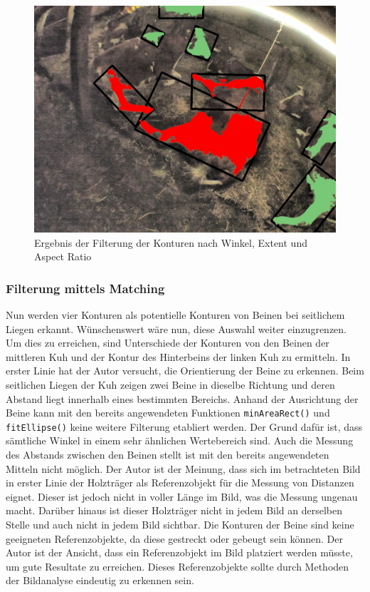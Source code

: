 \begin{figure}[H]
	\center
	\includegraphics[scale=0.43]{Grafiken/entwicklung/30FilteredByExtentAspectAngle.jpg}
	\caption{Ergebnis der Filterung der Konturen nach Winkel, Extent und Aspect Ratio} 
	\label{fig: Ergebnis der Filterung der Konturen nach Winkel, Extent und Aspect Ratio} 
\end{figure}

\subsubsection{Filterung mittels \flqqShape Matching\frqq }
Nun werden vier Konturen als potentielle Konturen von Beinen bei seitlichem Liegen erkannt. Wünschenswert wäre nun, diese Auswahl weiter einzugrenzen. Um dies zu erreichen, sind Unterschiede der Konturen von den Beinen der mittleren Kuh und der Kontur des Hinterbeins der linken Kuh zu ermitteln. In erster Linie hat der Autor versucht, die Orientierung der Beine zu erkennen. Beim seitlichen Liegen der Kuh zeigen zwei Beine in dieselbe Richtung und deren Abstand liegt innerhalb eines bestimmten Bereichs. Anhand der Ausrichtung der Beine kann mit den bereits angewendeten Funktionen \texttt{minAreaRect()} und \texttt{fitEllipse()} keine weitere Filterung etabliert werden. Der Grund dafür ist, dass sämtliche Winkel in einem sehr ähnlichen Wertebereich sind. Auch die Messung des Abstands zwischen den Beinen stellt ist mit den bereits angewendeten Mitteln nicht möglich. Der Autor ist der Meinung, dass sich im betrachteten Bild in erster Linie der Holzträger als Referenzobjekt für die Messung von Distanzen eignet. Dieser ist jedoch nicht in voller Länge im Bild, was die Messung ungenau macht. Darüber hinaus ist dieser Holzträger nicht in jedem Bild an derselben Stelle und auch nicht in jedem Bild sichtbar. Die Konturen der Beine sind keine geeigneten Referenzobjekte, da diese gestreckt oder gebeugt sein können. Der Autor ist der Ansicht, dass ein Referenzobjekt im Bild platziert werden müsste, um gute Resultate zu erreichen. Dieses Referenzobjekte sollte durch Methoden der Bildanalyse eindeutig zu erkennen sein.

